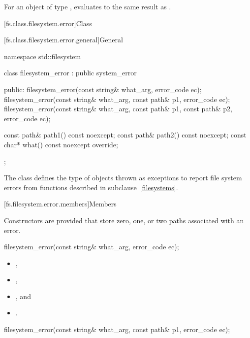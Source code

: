 \begin{itemdescr}
\pnum
For an object  of type ,
 evaluates to the same result as
.
\end{itemdescr}

[fs.class.filesystem.error]{Class }

[fs.class.filesystem.error.general]{General}

%
\begin{codeblock}
namespace std::filesystem {
  class filesystem_error : public system_error {
  public:
    filesystem_error(const string& what_arg, error_code ec);
    filesystem_error(const string& what_arg,
                     const path& p1, error_code ec);
    filesystem_error(const string& what_arg,
                     const path& p1, const path& p2, error_code ec);

    const path& path1() const noexcept;
    const path& path2() const noexcept;
    const char* what() const noexcept override;
  };
}
\end{codeblock}
\pnum
The class  defines the type of
objects thrown as exceptions to report file system errors from functions described in
subclause~\ref{filesystems}.

[fs.filesystem.error.members]{Members}

\pnum
 Constructors are provided that store zero, one, or two paths associated with
an error.

%
\begin{itemdecl}
filesystem_error(const string& what_arg, error_code ec);
\end{itemdecl}

\begin{itemdescr}
\pnum
\ensures
\begin{itemize}
\item {},
\item {},
\item {}, and
\item {} .
\end{itemize}
\end{itemdescr}

%
\begin{itemdecl}
filesystem_error(const string& what_arg, const path& p1, error_code ec);
\end{itemdecl}


